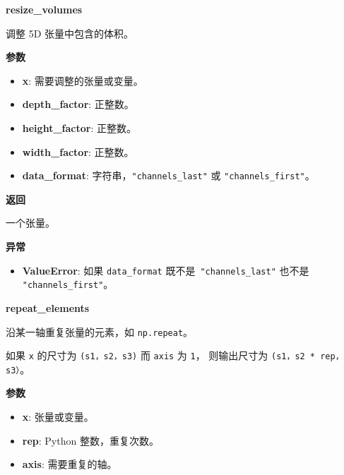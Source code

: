 \textbf{resize\_volumes}\label{resizeux5fvolumes}

\begin{Shaded}
\begin{Highlighting}[]
\end{Highlighting}
\end{Shaded}

调整 5D 张量中包含的体积。

\textbf{参数}

\begin{itemize}
\tightlist
\item
  \textbf{x}: 需要调整的张量或变量。
\item
  \textbf{depth\_factor}: 正整数。
\item
  \textbf{height\_factor}: 正整数。
\item
  \textbf{width\_factor}: 正整数。
\item
  \textbf{data\_format}: 字符串，\texttt{"channels\_last"} 或
  \texttt{"channels\_first"}。
\end{itemize}

\textbf{返回}

一个张量。

\textbf{异常}

\begin{itemize}
\tightlist
\item
  \textbf{ValueError}: 如果 \texttt{data\_format}
  既不是~\texttt{"channels\_last"} 也不是 \texttt{"channels\_first"}。
\end{itemize}


\textbf{repeat\_elements}\label{repeatux5felements}

\begin{Shaded}
\begin{Highlighting}[]
\end{Highlighting}
\end{Shaded}

沿某一轴重复张量的元素，如 \texttt{np.repeat}。

如果 \texttt{x} 的尺寸为 \texttt{(s1，s2，s3)} 而 \texttt{axis} 为
\texttt{1}， 则输出尺寸为 \texttt{(s1，s2\ *\ rep，s3）}。

\textbf{参数}

\begin{itemize}
\tightlist
\item
  \textbf{x}: 张量或变量。
\item
  \textbf{rep}: Python 整数，重复次数。
\item
  \textbf{axis}: 需要重复的轴。
\end{itemize}

